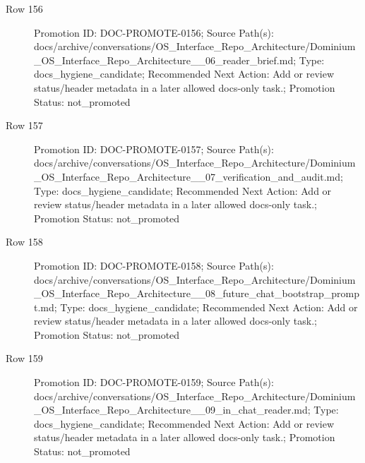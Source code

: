 \documentclass[9pt,a4paper,openany]{book}
\begin{document}
\begin{description}
\item[Row 156] Promotion ID: DOC-\allowbreak{}PROMOTE-\allowbreak{}0156; Source Path(s): docs/\allowbreak{}archive/\allowbreak{}conversations/\allowbreak{}OS\_\allowbreak{}Interface\_\allowbreak{}Repo\_\allowbreak{}Architecture/\allowbreak{}Dominium\_\allowbreak{}OS\_\allowbreak{}Interface\_\allowbreak{}Repo\_\allowbreak{}Architecture\_\allowbreak{}\_\allowbreak{}06\_\allowbreak{}reader\_\allowbreak{}brief.\allowbreak{}md; Type: docs\_\allowbreak{}hygiene\_\allowbreak{}candidate; Recommended Next Action: Add or review status/\allowbreak{}header metadata in a later allowed docs-\allowbreak{}only task.\allowbreak{}; Promotion Status: not\_\allowbreak{}promoted
\item[Row 157] Promotion ID: DOC-\allowbreak{}PROMOTE-\allowbreak{}0157; Source Path(s): docs/\allowbreak{}archive/\allowbreak{}conversations/\allowbreak{}OS\_\allowbreak{}Interface\_\allowbreak{}Repo\_\allowbreak{}Architecture/\allowbreak{}Dominium\_\allowbreak{}OS\_\allowbreak{}Interface\_\allowbreak{}Repo\_\allowbreak{}Architecture\_\allowbreak{}\_\allowbreak{}07\_\allowbreak{}verification\_\allowbreak{}and\_\allowbreak{}audit.\allowbreak{}md; Type: docs\_\allowbreak{}hygiene\_\allowbreak{}candidate; Recommended Next Action: Add or review status/\allowbreak{}header metadata in a later allowed docs-\allowbreak{}only task.\allowbreak{}; Promotion Status: not\_\allowbreak{}promoted
\item[Row 158] Promotion ID: DOC-\allowbreak{}PROMOTE-\allowbreak{}0158; Source Path(s): docs/\allowbreak{}archive/\allowbreak{}conversations/\allowbreak{}OS\_\allowbreak{}Interface\_\allowbreak{}Repo\_\allowbreak{}Architecture/\allowbreak{}Dominium\_\allowbreak{}OS\_\allowbreak{}Interface\_\allowbreak{}Repo\_\allowbreak{}Architecture\_\allowbreak{}\_\allowbreak{}08\_\allowbreak{}future\_\allowbreak{}chat\_\allowbreak{}bootstrap\_\allowbreak{}prompt.\allowbreak{}md; Type: docs\_\allowbreak{}hygiene\_\allowbreak{}candidate; Recommended Next Action: Add or review status/\allowbreak{}header metadata in a later allowed docs-\allowbreak{}only task.\allowbreak{}; Promotion Status: not\_\allowbreak{}promoted
\item[Row 159] Promotion ID: DOC-\allowbreak{}PROMOTE-\allowbreak{}0159; Source Path(s): docs/\allowbreak{}archive/\allowbreak{}conversations/\allowbreak{}OS\_\allowbreak{}Interface\_\allowbreak{}Repo\_\allowbreak{}Architecture/\allowbreak{}Dominium\_\allowbreak{}OS\_\allowbreak{}Interface\_\allowbreak{}Repo\_\allowbreak{}Architecture\_\allowbreak{}\_\allowbreak{}09\_\allowbreak{}in\_\allowbreak{}chat\_\allowbreak{}reader.\allowbreak{}md; Type: docs\_\allowbreak{}hygiene\_\allowbreak{}candidate; Recommended Next Action: Add or review status/\allowbreak{}header metadata in a later allowed docs-\allowbreak{}only task.\allowbreak{}; Promotion Status: not\_\allowbreak{}promoted

\end{description}
\end{document}
